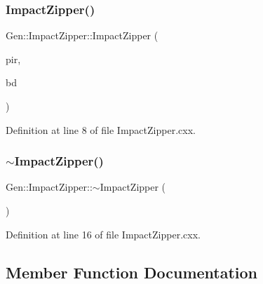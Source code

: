 \subsubsection{\texorpdfstring{Impact\+Zipper()}{ImpactZipper()}}
{\footnotesize\ttfamily Gen\+::\+Impact\+Zipper\+::\+Impact\+Zipper (\begin{DoxyParamCaption}\item[{\hyperlink{class_wire_cell_1_1_interface_a09c548fb8266cfa39afb2e74a4615c37}{I\+Plane\+Impact\+Response\+::pointer}}]{pir,  }\item[{\hyperlink{class_wire_cell_1_1_gen_1_1_binned_diffusion}{Binned\+Diffusion} \&}]{bd }\end{DoxyParamCaption})}



Definition at line 8 of file Impact\+Zipper.\+cxx.

\mbox{\label{class_wire_cell_1_1_gen_1_1_impact_zipper_a1c530ae00e741ecf8966371dbd12d85e}} 
\subsubsection{\texorpdfstring{$\sim$\+Impact\+Zipper()}{~ImpactZipper()}}
{\footnotesize\ttfamily Gen\+::\+Impact\+Zipper\+::$\sim$\+Impact\+Zipper (\begin{DoxyParamCaption}{ }\end{DoxyParamCaption})\hspace{0.3cm}{\ttfamily [virtual]}}



Definition at line 16 of file Impact\+Zipper.\+cxx.



\subsection{Member Function Documentation}
\mbox{\label{class_wire_cell_1_1_gen_1_1_impact_zipper_a542bc19237317cce10742ae097e647ec}} 
